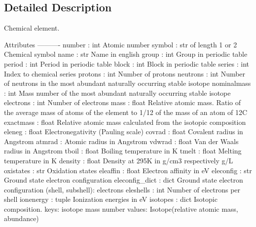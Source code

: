 \subsection{Detailed Description}
\begin{DoxyVerb}Chemical element.

Attributes
----------
number : int
    Atomic number
symbol : str of length 1 or 2
    Chemical symbol
name : str
    Name in english
group : int
    Group in periodic table
period : int
    Period in periodic table
block : int
    Block in periodic table
series : int
    Index to chemical series
protons : int
    Number of protons
neutrons : int
    Number of neutrons in the most abundant naturally occurring stable
    isotope
nominalmass : int
    Mass number of the most abundant naturally occurring stable isotope
electrons : int
    Number of electrons
mass : float
    Relative atomic mass. Ratio of the average mass of atoms
    of the element to 1/12 of the mass of an atom of 12C
exactmass : float
    Relative atomic mass calculated from the isotopic composition
eleneg : float
    Electronegativity (Pauling scale)
covrad : float
    Covalent radius in Angstrom
atmrad :
    Atomic radius in Angstrom
vdwrad : float
    Van der Waals radius in Angstrom
tboil : float
    Boiling temperature in K
tmelt : float
    Melting temperature in K
density : float
    Density at 295K in g/cm3 respectively g/L
oxistates : str
    Oxidation states
eleaffin : float
    Electron affinity in eV
eleconfig : str
    Ground state electron configuration
eleconfig_dict : dict
    Ground state electron configuration (shell, subshell): electrons
eleshells : int
    Number of electrons per shell
ionenergy : tuple
    Ionization energies in eV
isotopes : dict
    Isotopic composition.
    keys: isotope mass number
    values: Isotope(relative atomic mass, abundance)\end{DoxyVerb}
 


